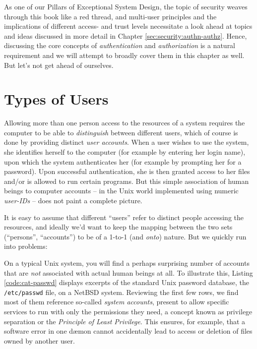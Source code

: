 As one of our Pillars of Exceptional System Design,
the topic of security weaves through this book like a
red thread, and multi-user principles and the
implications of different access- and trust levels
necessitate a look ahead at topics and ideas discussed
in more detail in Chapter
\ref{sec:security:authn-authz}.  Hence, discussing
the core concepts of {\em
authentication} and {\em
authorization} is a natural
requirement and we will attempt to broadly cover them
in this chapter as well.  But let's not get ahead of
ourselves.


\section{Types of Users}
\label{multi-user:types}

Allowing more than one person access to the resources
of a system requires the computer to be able to {\em
distinguish} between different users, which of course
is done by providing distinct {\em user accounts}.
When a user wishes to use the system, she identifies
herself to the computer (for example by entering her
login name), upon which the system authenticates her
(for example by prompting her for a password). Upon
successful authentication, she is then granted access
to her files and/or is allowed to run certain
programs.  But this simple association of human beings
to computer accounts -- in the Unix world implemented
using numeric {\em user-IDs} -- does not paint a
complete picture.

It is easy to assume that different ``users'' refer to
distinct people accessing the resources, and ideally
we'd want to keep the mapping between the two sets
(``persons'', ``accounts'') to be of a 1-to-1 (and
{\em onto}) nature.  But we quickly run into problems:

On a typical Unix system, you will find a perhaps
surprising number of accounts that are {\em not}
associated with actual human beings at all. To
illustrate this, Listing \ref{code:cat-passwd}
displays excerpts of the standard Unix password
database, the {\tt /etc/passwd} file, on a NetBSD
system.  Reviewing the first few rows, we find most of
them reference so-called {\em system
accounts}, present to allow
specific services to run with only the permissions
they need, a concept known as privilege
separation or the
{\em Principle of Least Privilege}. This ensures, for example, that a
software error in one d\ae mon cannot accidentally
lead to access or deletion of files owned by another
user.

